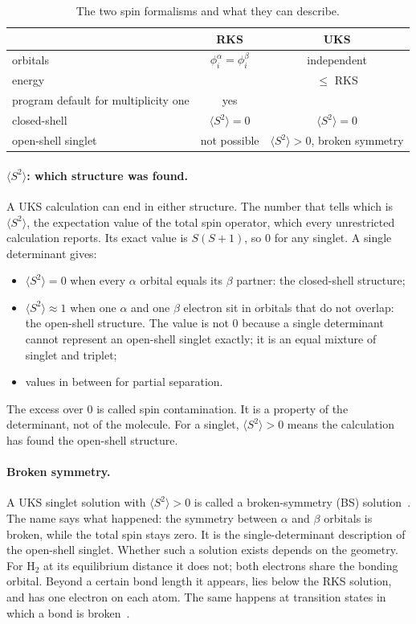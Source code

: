 \begin{table}[h]
\centering
\small
\caption{The two spin formalisms and what they can describe.}
\label{tab:rks-uks}
\begin{tabular}{@{}lcc@{}}
\toprule
 & RKS & UKS \\
\midrule
orbitals & $\phi_i^{\alpha} = \phi_i^{\beta}$ & independent \\
energy & & $\le$ RKS \\
program default for multiplicity one & yes & \\
\midrule
closed-shell & $\langle S^2 \rangle = 0$ & $\langle S^2 \rangle = 0$ \\
open-shell singlet & not possible & $\langle S^2 \rangle > 0$, broken symmetry \\
\bottomrule
\end{tabular}
\end{table}

\paragraph{$\langle S^2 \rangle$: which structure was found.} A UKS
calculation can end in either structure. The number that tells which is
$\langle S^2 \rangle$, the expectation value of the total spin operator,
which every unrestricted calculation reports. Its exact value is $S(S+1)$,
so 0 for any singlet. A single determinant gives:

\begin{itemize}
  \item $\langle S^2 \rangle = 0$ when every $\alpha$ orbital equals its
    $\beta$ partner: the closed-shell structure;
  \item $\langle S^2 \rangle \approx 1$ when one $\alpha$ and one $\beta$
    electron sit in orbitals that do not overlap: the open-shell structure.
    The value is not 0 because a single determinant cannot represent an
    open-shell singlet exactly; it is an equal mixture of singlet and
    triplet;
  \item values in between for partial separation.
\end{itemize}

The excess over 0 is called spin contamination. It is a property of the
determinant, not of the molecule. For a singlet, $\langle S^2 \rangle > 0$
means the calculation has found the open-shell structure.

\paragraph{Broken symmetry.} A UKS singlet solution with
$\langle S^2 \rangle > 0$ is called a broken-symmetry (BS)
solution~\cite{noodleman1981}. The name says what happened: the symmetry
between $\alpha$ and $\beta$ orbitals is broken, while the total spin stays
zero. It is the single-determinant description of the open-shell singlet.
Whether such a solution exists depends on the geometry. For H$_2$ at its
equilibrium distance it does not; both electrons share the bonding
orbital. Beyond a certain bond length it appears, lies below the RKS
solution, and has one electron on each atom. The same happens at
transition states in which a bond is broken~\cite{bursch2022}.

